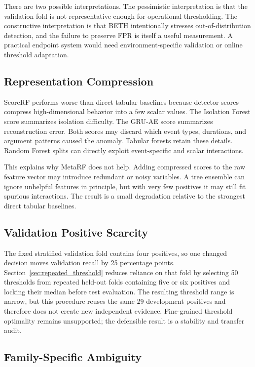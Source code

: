 \documentclass[10pt,journal,compsoc]{IEEEtran}
\begin{document}
There are two possible interpretations. The pessimistic interpretation is that the validation fold is not representative enough for operational thresholding. The constructive interpretation is that BETH intentionally stresses out-of-distribution detection, and the failure to preserve FPR is itself a useful measurement. A practical endpoint system would need environment-specific validation or online threshold adaptation.

\subsection{Representation Compression}

ScoreRF performs worse than direct tabular baselines because detector scores compress high-dimensional behavior into a few scalar values. The Isolation Forest score summarizes isolation difficulty. The GRU-AE score summarizes reconstruction error. Both scores may discard which event types, durations, and argument patterns caused the anomaly. Tabular forests retain these details. Random Forest splits can directly exploit event-specific and scalar interactions.

This explains why MetaRF does not help. Adding compressed scores to the raw feature vector may introduce redundant or noisy variables. A tree ensemble can ignore unhelpful features in principle, but with very few positives it may still fit spurious interactions. The result is a small degradation relative to the strongest direct tabular baselines.

\subsection{Validation Positive Scarcity}

The fixed stratified validation fold contains four positives, so one changed decision moves validation recall by 25 percentage points. Section~\ref{sec:repeated_threshold} reduces reliance on that fold by selecting 50 thresholds from repeated held-out folds containing five or six positives and locking their median before test evaluation. The resulting threshold range is narrow, but this procedure reuses the same 29 development positives and therefore does not create new independent evidence. Fine-grained threshold optimality remains unsupported; the defensible result is a stability and transfer audit.

\subsection{Family-Specific Ambiguity}
\end{document}
